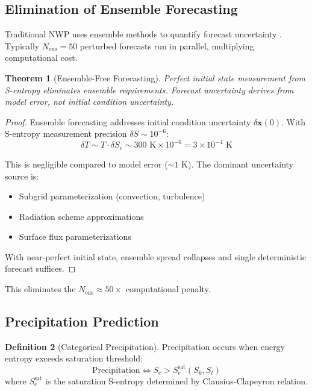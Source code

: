 \documentclass[twocolumn,10pt,a4paper]{article}
\newtheorem{theorem}{Theorem}[section]
\theoremstyle{definition}
\newtheorem{definition}[theorem]{Definition}
\theoremstyle{remark}
\begin{document}
\subsection{Elimination of Ensemble Forecasting}

Traditional NWP uses ensemble methods to quantify forecast uncertainty \cite{palmer2019ensemble}. Typically $N_{\text{ens}} = 50$ perturbed forecasts run in parallel, multiplying computational cost.

\begin{theorem}[Ensemble-Free Forecasting]
\label{thm:ensemble_free}
Perfect initial state measurement from S-entropy eliminates ensemble requirements. Forecast uncertainty derives from model error, not initial condition uncertainty.
\end{theorem}

\begin{proof}
Ensemble forecasting addresses initial condition uncertainty $\delta\mathbf{x}(0)$. With S-entropy measurement precision $\delta S \sim 10^{-6}$:
\begin{equation}
    \delta T \sim T \cdot \delta S_e \sim 300 \text{ K} \times 10^{-6} = 3 \times 10^{-4} \text{ K}
\end{equation}

This is negligible compared to model error ($\sim 1$ K). The dominant uncertainty source is:
\begin{itemize}
    \item Subgrid parameterization (convection, turbulence)
    \item Radiation scheme approximations
    \item Surface flux parameterizations
\end{itemize}

With near-perfect initial state, ensemble spread collapses and single deterministic forecast suffices.
\end{proof}

This eliminates the $N_{\text{ens}} \approx 50\times$ computational penalty.

\subsection{Precipitation Prediction}

\begin{definition}[Categorical Precipitation]
\label{def:precip}
Precipitation occurs when energy entropy exceeds saturation threshold:
\begin{equation}
    \text{Precipitation} \Leftrightarrow S_e > S_e^{\text{sat}}(S_k, S_t)
\end{equation}
where $S_e^{\text{sat}}$ is the saturation S-entropy determined by Clausius-Clapeyron relation.
\end{definition}
\end{document}
